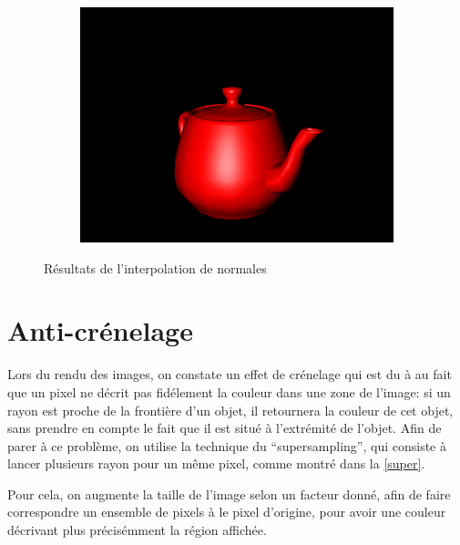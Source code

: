 \documentclass{article}
\begin{document}
\begin{figure}[hb]
  \begin{subfigure}{0.45\textwidth}
    \includegraphics[width=1\textwidth]{images/nres1.png}
  \end{subfigure}

  \caption{Résultats de l'interpolation de normales\label{normal}}
\end{figure}

\section{Anti-crénelage}

Lors du rendu des images, on constate un effet de crénelage qui est du à au
fait que un pixel ne décrit pas fidélement la couleur dans une zone de l'image:
si un rayon est proche de la frontière d'un objet, il retournera la couleur de
cet objet, sans prendre en compte le fait que il est situé à l'extrémité de
l'objet. Afin de parer à ce problème, on utilise la technique du
``supersampling'', qui consiste à lancer plusieurs rayon pour un même pixel,
comme montré dans la \cref{super}.

Pour cela, on augmente la taille de l'image selon un facteur donné, afin de
faire correspondre un ensemble de pixels à le pixel d'origine, pour avoir une
couleur décrivant plus précisémment la région affichée.
\end{document}
